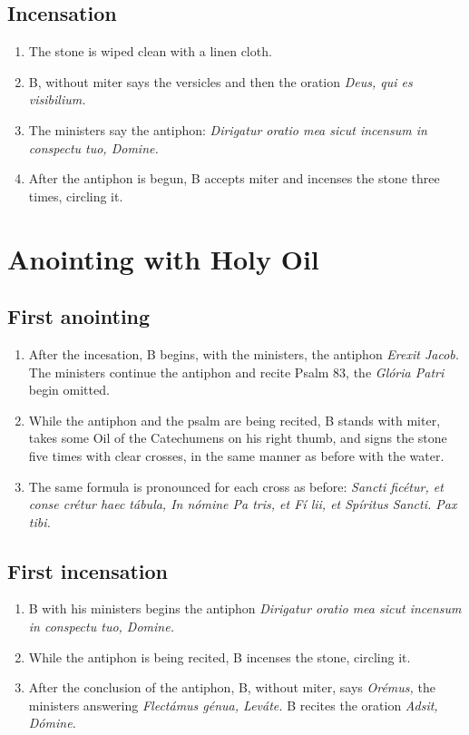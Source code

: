 \documentclass[twocolumn]{report}
\begin{document}
\subsection*{Incensation}
\begin{enumerate}
	\item The stone is wiped clean with a linen cloth.
	\item B, without miter says the versicles and then the oration \textit{Deus, qui es visibilium.}
	\item The ministers say the antiphon: \textit{Dirigatur oratio mea sicut incensum in conspectu tuo, Domine.}
	\item After the antiphon is begun, B accepts miter and incenses the stone three times, circling it.
\end{enumerate}
\section*{Anointing with Holy Oil}
\subsection*{First anointing}
\begin{enumerate}
	\item After the incesation, B begins, with the ministers, the antiphon \textit{Erexit Jacob.} The ministers continue the antiphon and recite Psalm 83, the \textit{Glória Patri} begin omitted.
	\item While the antiphon and the psalm are being recited, B stands with miter, takes some Oil of the Catechumens on his right thumb, and signs the stone five times with clear crosses, in the same manner as before with the water. 
	\item The same formula is pronounced for each cross as before: \textit{Sancti  ficétur, et conse  crétur haec tábula, In nómine Pa  tris, et Fí  lii, et Spíritus  Sancti. Pax tibi.}
\end{enumerate}
\subsection*{First incensation}
\begin{enumerate}
	\item B with his ministers begins the antiphon \textit{Dirigatur oratio mea sicut incensum in conspectu tuo, Domine.}
	\item While the antiphon is being recited, B incenses the stone, circling it.
	\item After the conclusion of the antiphon, B, without miter, says \textit{Orémus,} the ministers answering \textit{Flectámus génua, Leváte.} B recites the oration \textit{Adsit, Dómine.}
\end{enumerate}
\end{document}
